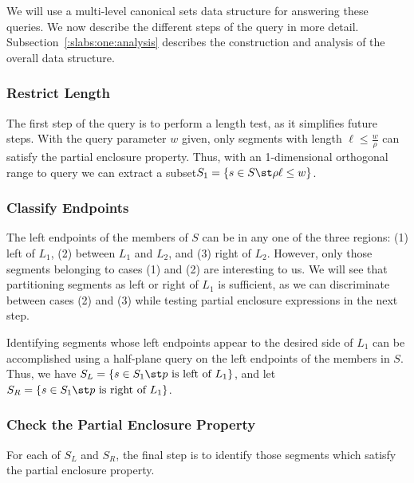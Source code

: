 We will use a multi-level canonical sets data structure 
\cite{chan2012} for answering these queries. 
We now describe the different steps of the query in more detail. 
Subsection~\ref{:slabs:one:analysis} describes the construction 
and analysis of the overall data structure.


\subsubsection*{Restrict Length}
The first step of the query is to perform a length test, as it 
simplifies future steps. With the query parameter $w$ given, 
only segments with length $\ell \leq \frac{w}{\rho}$ can satisfy 
the partial enclosure property. Thus, with an 1-dimensional 
orthogonal range to query we can extract a subset$S_1 = \{ s\in 
S \st \rho \ell \leq w \}$.


\subsubsection*{Classify Endpoints}
The left endpoints of the members of $S$ can be in any one of the three 
regions: (1) left of $L_1$, (2) between $L_1$ and $L_2$, and (3) right 
of $L_2$. However, only those segments belonging to cases (1) and (2) 
are interesting to us. We will see that partitioning segments as left 
or right of $L_1$ is sufficient, as we can discriminate between cases 
(2) and (3) while testing partial enclosure expressions in the next step.

Identifying segments whose left endpoints appear to the desired side of 
$L_1$ can be accomplished using a half-plane query on the left endpoints 
of the members in $S$. Thus, we have $S_L = \{ s \in S_1 \st p \text{ is 
left of } L_1 \}$, and let $S_R = \{ s \in S_1 \st p \text{ is right of 
} L_1 \}$.


\subsubsection*{Check the Partial Enclosure Property}
For each of $S_L$ and $S_R$, the final step is to identify those segments 
which satisfy the partial enclosure property.

